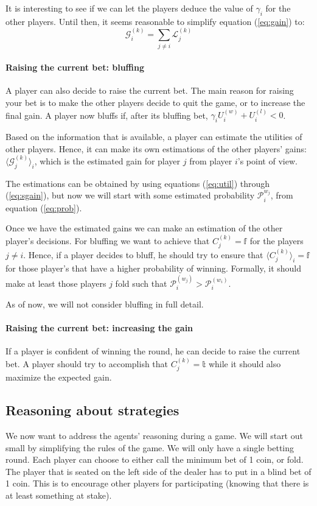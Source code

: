 \documentclass[a4paper,10pt]{article}
\begin{document}
It is interesting to see if we can let the players deduce the value of $\gamma_i$ for the other players. Until then, it seems reasonable to simplify equation (\ref{eq:gain}) to:
\begin{equation}
\mathcal{G}^{(k)}_i = \sum_{j\neq i} \mathcal L^{(k)}_j
\label{eq:sgain}
\end{equation}

\paragraph{Raising the current bet: bluffing}
A player can also decide to raise the current bet. The main reason for raising your bet is to make the other players decide to quit the game, or to increase the final gain. A player now bluffs if, after its bluffing bet, $\gamma_i U^{(w)}_i + U^{(l)}_i < 0$. 

Based on the information that is available, a player can estimate the utilities of other players. Hence, it can make its own estimations of the other players' gains: $\langle \mathcal G^{(k)}_j \rangle_i$, which is the estimated gain for player $j$ from player $i$'s point of view. 

The estimations can be obtained by using equations (\ref{eq:util}) through (\ref{eq:sgain}), but now we will start with some estimated probability $\mathcal P^{w_j}_i$, from equation (\ref{eq:prob}).

Once we have the estimated gains we can make an estimation of the other player's decisions. For bluffing we want to achieve that $C^{(k)}_j = \mathbb{f}$ for the players $j\neq i$. Hence, if a player decides to bluff, he should try to ensure that $\langle C^{(k)}_j \rangle_i = \mathbb{f}$ for those player's that have a higher probability of winning. Formally, it should make at least those players $j$ fold such that $\mathcal P^{(w_j)}_i > \mathcal P^{(w_i)}_i$. 

As of now, we will not consider bluffing in full detail.

\paragraph{Raising the current bet: increasing the gain}
If a player is confident of winning the round, he can decide to raise the current bet. A player should try to accomplish that $C^{(k)}_j = \mathbb{t}$ while it should also maximize the expected gain. 

\subsection{Reasoning about strategies}
We now want to address the agents' reasoning during a game. We will start out small by simplifying the rules of the game. We will only have a single betting round. Each player can choose to either call the minimum bet of 1 coin, or fold. The player that is seated on the left side of the dealer has to put in a blind bet of 1 coin. This is to encourage other players for participating (knowing that there is at least something at stake).
\end{document}
